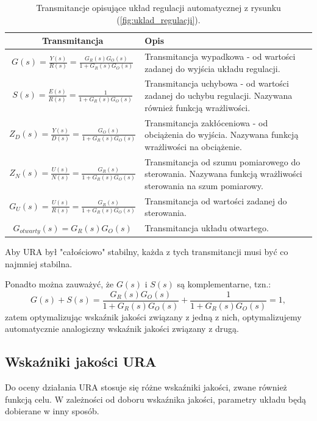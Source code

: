 \documentclass{article}
\begin{document}
    \begin{table}[H]
        \centering
        \begin{tabular}{|c|p{10cm}|}
            \hline
            \textbf{Transmitancja} & \textbf{Opis} \\
            \hline
            $G(s) = \frac{Y(s)}{R(s)} = \frac{G_{R}(s)G_{O}(s)}{1 + G_{R}(s)G_{O}(s)}$ & Transmitancja wypadkowa - od wartości zadanej do wyjścia układu regulacji.\\
            \hline
            $S(s) = \frac{E(s)}{R(s)} = \frac{1}{1 + G_{R}(s)G_{O}(s)}$ & Transmitancja uchybowa - od wartości zadanej do uchybu regulacji. Nazywana również funkcją wrażliwości.\\
            \hline
            $Z_{D}(s) = \frac{Y(s)}{D(s)} = \frac{G_{O}(s)}{1 + G_{R}(s)G_{O}(s)}$ & Transmitancja zakłóceniowa - od obciążenia do wyjścia. Nazywana funkcją wrażliwości na obciążenie.\\
            \hline
            $Z_{N}(s) = \frac{U(s)}{N(s)} = \frac{G_{R}(s)}{1 + G_{R}(s)G_{O}(s)}$ & Transmitancja od szumu pomiarowego do sterowania. Nazywana funkcją wrażliwości sterowania na szum pomiarowy.\\
            \hline
            $G_{U}(s) = \frac{U(s)}{R(s)} = \frac{G_{R}(s)}{1 + G_{R}(s)G_{O}(s)}$ & Transmitancja od wartości zadanej do sterowania.\\
            \hline
            $G_{otwarty}(s) = G_{R}(s)G_{O}(s)$ & Transmitancja układu otwartego.\\
            \hline
        \end{tabular}
        \caption{Transmitancje opisujące układ regulacji automatycznej z rysunku (\ref{fig:uklad_regulacji}).}
        \label{tab:uklad_regulacji_transmitancje}
    \end{table}

    Aby URA był "całościowo" stabilny, każda z tych transmitancji musi być co najmniej stabilna.

    Ponadto można zauważyć, że $G(s)$ i $S(s)$ są komplementarne, tzn.:
    $$
        G(s) + S(s) = \frac{G_{R}(s)G_{O}(s)}{1 + G_{R}(s)G_{O}(s)} + \frac{1}{1 + G_{R}(s)G_{O}(s)} = 1,
    $$
    zatem optymalizując wskaźnik jakości związany z jedną z nich, optymalizujemy automatycznie analogiczny wskaźnik jakości związany z drugą.
    \subsection{Wskaźniki jakości URA}
    Do oceny działania URA stosuje się różne wskaźniki jakości, zwane również funkcją celu.
    W zależności od doboru wskaźnika jakości, parametry układu będą dobierane w inny sposób.
\end{document}
